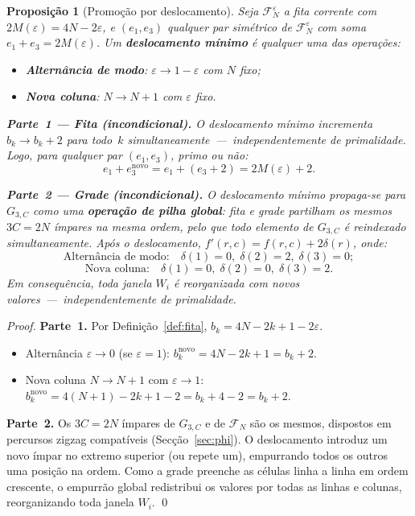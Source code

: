 \documentclass[12pt, a4paper]{article}
\theoremstyle{plain}
\newtheorem{proposition}[theorem]{Proposição}
\theoremstyle{definition}
\theoremstyle{remark}
\begin{document}
	\begin{proposition}[Promoção por deslocamento]
		\label{prop:promocao}
		Seja $\mathcal{F}_N^\varepsilon$ a fita corrente com
		$2M(\varepsilon)=4N-2\varepsilon$, e $(e_1,e_3)$ qualquer par
		simétrico de $\mathcal{F}_N^\varepsilon$ com soma
		$e_1+e_3=2M(\varepsilon)$.  Um \textbf{deslocamento mínimo} é
		qualquer uma das operações:
		\begin{itemize}
			\item \textbf{Alternância de modo}:
			$\varepsilon\to1-\varepsilon$ com $N$ fixo;
			\item \textbf{Nova coluna}: $N\to N+1$ com $\varepsilon$ fixo.
		\end{itemize}
		
		\medskip
		\textbf{Parte~1 --- Fita (incondicional).}
		O deslocamento mínimo incrementa $b_k\to b_k+2$ para todo~$k$
		simultaneamente~---~independentemente de primalidade.  Logo, para
		qualquer par $(e_1,e_3)$, primo ou não:
		\[
		e_1 + e_3^{\text{novo}}
		= e_1 + (e_3+2)
		= 2M(\varepsilon)+2.
		\]
		
		\medskip
		\textbf{Parte~2 --- Grade (incondicional).}
		O deslocamento mínimo propaga-se para $G_{3,C}$ como uma
		\textbf{operação de pilha global}: fita e grade partilham os
		mesmos $3C=2N$ ímpares na mesma ordem, pelo que todo elemento de
		$G_{3,C}$ é reindexado simultaneamente.  Após o deslocamento,
		$f'(r,c) = f(r,c) + 2\delta(r)$, onde:
		\[
		\text{Alternância de modo:}\quad
		\delta(1)=0,\;\delta(2)=2,\;\delta(3)=0;
		\]
		\[
		\text{Nova coluna:}\quad
		\delta(1)=0,\;\delta(2)=0,\;\delta(3)=2.
		\]
		Em consequência, toda janela $W_i$ é reorganizada com novos
		valores~---~independentemente de primalidade.
	\end{proposition}
	
	\begin{proof}
		\textbf{Parte~1.}
		Por Definição~\ref{def:fita}, $b_k=4N-2k+1-2\varepsilon$.
		\begin{itemize}
			\item Alternância $\varepsilon\to0$ (se $\varepsilon=1$):
			$b_k^{\text{novo}}=4N-2k+1=b_k+2$. \checkmark
			\item Nova coluna $N\to N+1$ com $\varepsilon\to1$:
			$b_k^{\text{novo}}=4(N+1)-2k+1-2=b_k+4-2=b_k+2$. \checkmark
		\end{itemize}
		
		\textbf{Parte~2.}
		Os $3C=2N$ ímpares de $G_{3,C}$ e de $\mathcal{F}_N$ são os
		mesmos, dispostos em percursos zigzag compatíveis (Secção~\ref{sec:phi}).
		O deslocamento introduz um novo ímpar no extremo superior
		(ou repete um), empurrando todos os outros uma posição na ordem.
		Como a grade preenche as células linha a linha em ordem crescente,
		o empurrão global redistribui os valores por todas as linhas e
		colunas, reorganizando toda janela $W_i$. \qed
	\end{proof}
	
\end{document}
